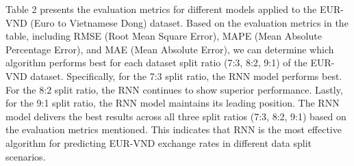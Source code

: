 \documentclass{ieeeojies}
\begin{document}
Table 2 presents the evaluation metrics for different models applied to the EUR-VND (Euro to Vietnamese Dong) dataset. Based on the evaluation metrics in the table, including RMSE (Root Mean Square Error), MAPE (Mean Absolute Percentage Error), and MAE (Mean Absolute Error), we can determine which algorithm performs best for each dataset split ratio (7:3, 8:2, 9:1) of the EUR-VND dataset. Specifically, for the 7:3 split ratio, the RNN model performs best. For the 8:2 split ratio, the RNN continues to show superior performance. Lastly, for the 9:1 split ratio, the RNN model maintains its leading position. The RNN model delivers the best results across all three split ratios (7:3, 8:2, 9:1) based on the evaluation metrics mentioned. This indicates that RNN is the most effective algorithm for predicting EUR-VND exchange rates in different data split scenarios.
\end{document}

